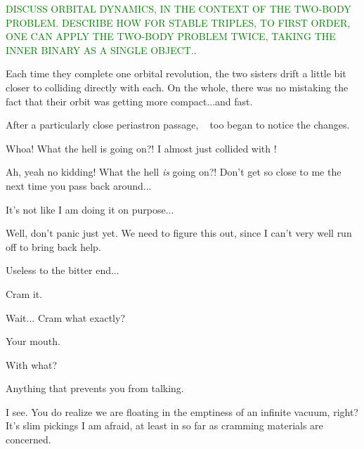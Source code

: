 \documentclass[main.tex]{subfiles}
\begin{document}
\begin{tcolorbox}[sharp corners, colback=green!30, colframe=green!80!blue, title=Orbital Dynamics]
\par \textcolor{green}{DISCUSS ORBITAL DYNAMICS, IN THE CONTEXT OF THE TWO-BODY PROBLEM.  DESCRIBE HOW FOR STABLE TRIPLES, TO FIRST ORDER, ONE CAN APPLY THE TWO-BODY PROBLEM TWICE, TAKING THE INNER BINARY AS A SINGLE OBJECT.}.  
\end{tcolorbox}

\par \nar Each time they complete one orbital revolution, the two sisters drift a little bit closer to colliding directly with each.  On the whole, there was no mistaking the fact that their orbit was getting more compact...and fast.

\par \nar After a particularly close periastron passage, \rmtaygete~ too began to notice the changes.

\par \Taygete  Whoa!  What the hell is going on?!  I almost just collided with \rmalcyone!

\par \Alcyone Ah, yeah no kidding!  What the hell \textit{is} going on?!  Don't get so close to me the next time you pass back around...

\par \Taygete It's not like I am doing it on purpose...

\par \Celaeno  Well, don't panic just yet.  We need to figure this out, since I can't very well run off to bring back help.

\par \Alcyone Useless to the bitter end...

\par \Celaeno Cram it.  

\par \Alcyone Wait... Cram what exactly?

\par \Celaeno Your mouth.  

\par \Alcyone With what?

\par \Celaeno Anything that prevents you from talking.  

\par \Alcyone I see.  You do realize we are floating in the emptiness of an infinite vacuum, right?  It's slim pickings I am afraid, at least in so far as cramming materials are concerned.
\end{document}
